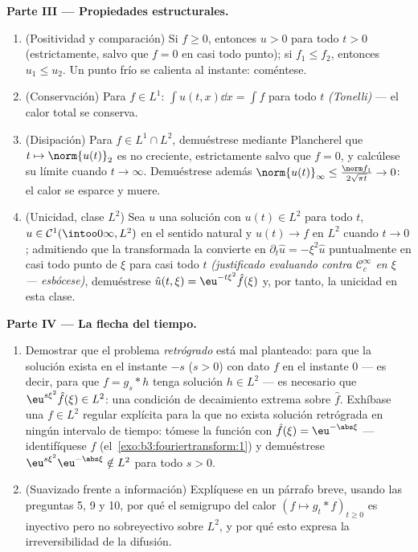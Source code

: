 \begin{problem}[{Problema de fin de semana --- $\partial_tu =
\partial^2_{xx}u$, resuelta de principio a fin}]
\medskip
\noindent\textbf{Parte III --- Propiedades estructurales.}
\begin{enumerate}[resume]
  \item (Positividad y comparación) Si $f \geq 0$, entonces $u > 0$ para
  todo $t > 0$ (estrictamente, salvo que $f = 0$ en casi todo punto); si
  $f_1 \leq f_2$, entonces $u_1 \leq u_2$. Un punto frío se calienta al
  instante: coméntese. \item (Conservación) Para $f \in L^1$:
  $\int u(t, x)\dd x =
        \int f$ para todo $t$ \emph{(Tonelli)} --- el calor total se
  conserva. \item (Disipación) Para $f \in L^1\cap L^2$, demuéstrese
  mediante Plancherel que $t \mapsto \norm{u(t)}_2$ es no creciente,
  estrictamente salvo que $f = 0$, y calcúlese su límite cuando
  $t \to \infty$. Demuéstrese además
  $\norm{u(t)}_\infty \leq \frac{\norm
        f_1}{2\sqrt{\pi t}} \to 0$: el calor se esparce y muere. \item
  (Unicidad, clase $L^2$) Sea $u$ una solución con $u(t) \in L^2$ para
  todo $t$, $u \in \mathcal
        C^1(\intoo0\infty, L^2)$ en el sentido natural y $u(t) \to f$ en
  $L^2$ cuando $t\to0$; admitiendo que la transformada la convierte en
  $\partial_t\hat u =
        -\xi^2\hat u$ puntualmente en casi todo punto de $\xi$ para casi
  todo $t$ \emph{(justificado evaluando contra $\mathcal
        C_c^\infty$ en $\xi$ --- esbócese)}, demuéstrese
  $\hat u(t,\xi) = \eu^{-t\xi^2}\hat f(\xi)$ y, por tanto, la unicidad
  en esta clase.
\end{enumerate}

\medskip
\noindent\textbf{Parte IV --- La flecha del tiempo.}
\begin{enumerate}[resume]
  \item Demostrar que el problema \emph{retrógrado} está mal planteado:
  para que la solución exista en el instante $-s$ ($s > 0$) con dato $f$
  en el instante $0$ --- es decir, para que $f = g_s * h$ tenga solución
  $h \in L^2$ --- es necesario que $\eu^{s\xi^2}\hat f(\xi) \in L^2$:
  una condición de decaimiento extrema sobre $\hat f$. Exhíbase una $f
        \in L^2$ regular explícita para la que no exista solución
  retrógrada en ningún intervalo de tiempo: tómese la función con
  $\hat f(\xi) =
        \eu^{-\abs\xi}$ --- identifíquese $f$
  (el~\cref{exo:b3:fouriertransform:1}) y demuéstrese
  $\eu^{s\xi^2}\eu^{-\abs\xi} \notin L^2$ para todo $s >
        0$. \item (Suavizado frente a información) Explíquese en un
  párrafo breve, usando las preguntas 5, 9 y 10, por qué el semigrupo
  del calor $(f \mapsto g_t * f)_{t\geq0}$ es inyectivo pero no
  sobreyectivo sobre $L^2$, y por qué esto expresa la irreversibilidad
  de la difusión.
\end{enumerate}


\end{problem}
